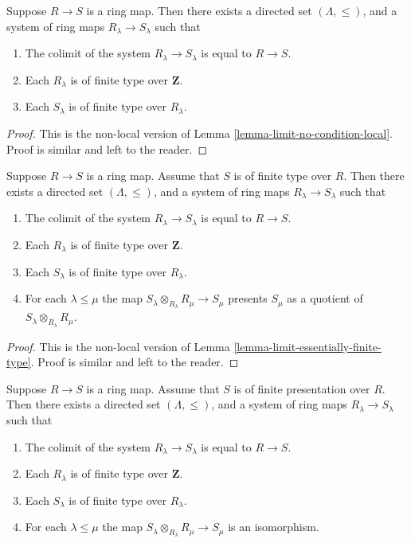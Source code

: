 \begin{lemma}
\label{lemma-limit-no-condition}
Suppose $R \to S$ is a ring map.
Then there exists a directed set $(\Lambda, \leq)$, and
a system of ring maps $R_\lambda \to S_\lambda$
such that
\begin{enumerate}
\item The colimit of the system $R_\lambda \to S_\lambda$
is equal to $R \to S$.
\item Each $R_\lambda$ is of finite type
over $\mathbf{Z}$.
\item Each $S_\lambda$ is of finite type
over $R_\lambda$.
\end{enumerate}
\end{lemma}

\begin{proof}
This is the non-local version of
Lemma \ref{lemma-limit-no-condition-local}.
Proof is similar and left to the reader.
\end{proof}

\begin{lemma}
\label{lemma-limit-finite-type}
Suppose $R \to S$ is a ring map.
Assume that $S$ is of finite type over $R$.
Then there exists a directed set $(\Lambda, \leq)$, and
a system of ring maps $R_\lambda \to S_\lambda$
such that
\begin{enumerate}
\item The colimit of the system $R_\lambda \to S_\lambda$
is equal to $R \to S$.
\item Each $R_\lambda$ is of finite type
over $\mathbf{Z}$.
\item Each $S_\lambda$ is of finite type
over $R_\lambda$.
\item For each $\lambda \leq \mu$ the map
$S_\lambda \otimes_{R_\lambda} R_\mu \to S_\mu$
presents $S_\mu$ as a quotient
of $S_\lambda \otimes_{R_\lambda} R_\mu$.
\end{enumerate}
\end{lemma}

\begin{proof}
This is the non-local version of
Lemma \ref{lemma-limit-essentially-finite-type}.
Proof is similar and left to the reader.
\end{proof}

\begin{lemma}
\label{lemma-limit-finite-presentation}
Suppose $R \to S$ is a ring map.
Assume that $S$ is of finite presentation over $R$.
Then there exists a directed set $(\Lambda, \leq)$, and
a system of ring maps $R_\lambda \to S_\lambda$
such that
\begin{enumerate}
\item The colimit of the system $R_\lambda \to S_\lambda$
is equal to $R \to S$.
\item Each $R_\lambda$ is of finite type
over $\mathbf{Z}$.
\item Each $S_\lambda$ is of finite type
over $R_\lambda$.
\item For each $\lambda \leq \mu$ the map
$S_\lambda \otimes_{R_\lambda} R_\mu \to S_\mu$
is an isomorphism.
\end{enumerate}
\end{lemma}

